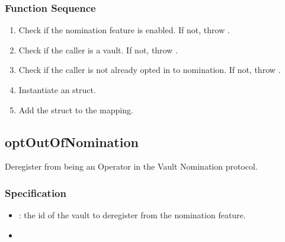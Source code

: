 \documentclass[a4paper,10pt,english]{sphinxmanual}
\begin{document}
\subsubsection{Function Sequence}
\label{\detokenize{spec/nomination:id8}}\begin{enumerate}
%
\item {} 
Check if the nomination feature is enabled. If not, throw .

\item {} 
Check if the caller is a vault. If not, throw .

\item {} 
Check if the caller is not already opted in to nomination. If not, throw .

\item {} 
Instantiate an  struct.

\item {} 
Add the struct to the  mapping.

\end{enumerate}


\subsection{optOutOfNomination}
\label{\detokenize{spec/nomination:optoutofnomination}}\label{\detokenize{spec/nomination:id9}}
Deregister from being an Operator in the Vault Nomination protocol.


\subsubsection{Specification}
\label{\detokenize{spec/nomination:id10}}


\begin{itemize}
\item {} 
: the id of the vault to deregister from the nomination feature.

\end{itemize}

\begin{itemize}
\item {} 

\end{itemize}
\end{document}
